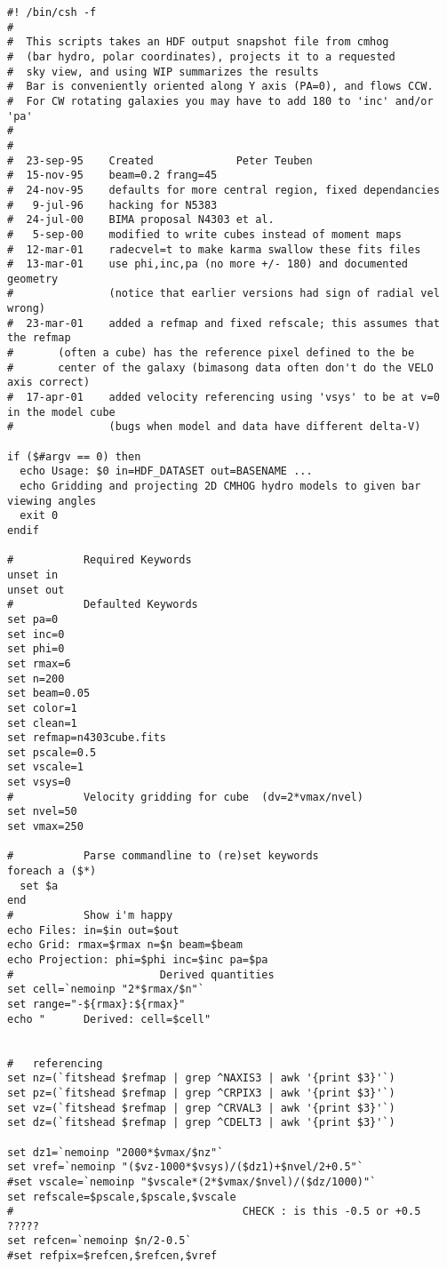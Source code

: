 \documentclass[11pt]{article}
\begin{document}
\footnotesize\begin{verbatim}
#! /bin/csh -f
#
#  This scripts takes an HDF output snapshot file from cmhog
#  (bar hydro, polar coordinates), projects it to a requested
#  sky view, and using WIP summarizes the results
#  Bar is conveniently oriented along Y axis (PA=0), and flows CCW.
#  For CW rotating galaxies you may have to add 180 to 'inc' and/or 'pa'
#
#
#  23-sep-95	Created				Peter Teuben
#  15-nov-95    beam=0.2 frang=45
#  24-nov-95    defaults for more central region, fixed dependancies
#   9-jul-96    hacking for N5383 
#  24-jul-00    BIMA proposal N4303 et al.
#   5-sep-00    modified to write cubes instead of moment maps
#  12-mar-01    radecvel=t to make karma swallow these fits files
#  13-mar-01    use phi,inc,pa (no more +/- 180) and documented geometry
#               (notice that earlier versions had sign of radial vel wrong)
#  23-mar-01    added a refmap and fixed refscale; this assumes that the refmap
#		(often a cube) has the reference pixel defined to the be 
#		center of the galaxy (bimasong data often don't do the VELO axis correct)
#  17-apr-01    added velocity referencing using 'vsys' to be at v=0 in the model cube
#               (bugs when model and data have different delta-V)

if ($#argv == 0) then
  echo Usage: $0 in=HDF_DATASET out=BASENAME ...
  echo Gridding and projecting 2D CMHOG hydro models to given bar viewing angles
  exit 0
endif

# 			Required Keywords
unset in
unset out
# 			Defaulted Keywords
set pa=0
set inc=0
set phi=0
set rmax=6
set n=200
set beam=0.05
set color=1
set clean=1
set refmap=n4303cube.fits
set pscale=0.5
set vscale=1
set vsys=0
#			Velocity gridding for cube  (dv=2*vmax/nvel)
set nvel=50
set vmax=250

#			Parse commandline to (re)set keywords
foreach a ($*)
  set $a
end
#			Show i'm happy
echo Files: in=$in out=$out 
echo Grid: rmax=$rmax n=$n beam=$beam
echo Projection: phi=$phi inc=$inc pa=$pa
#                       Derived quantities
set cell=`nemoinp "2*$rmax/$n"`
set range="-${rmax}:${rmax}"
echo "      Derived: cell=$cell"


#   referencing 
set nz=(`fitshead $refmap | grep ^NAXIS3 | awk '{print $3}'`)
set pz=(`fitshead $refmap | grep ^CRPIX3 | awk '{print $3}'`)
set vz=(`fitshead $refmap | grep ^CRVAL3 | awk '{print $3}'`)
set dz=(`fitshead $refmap | grep ^CDELT3 | awk '{print $3}'`)

set dz1=`nemoinp "2000*$vmax/$nz"`
set vref=`nemoinp "($vz-1000*$vsys)/($dz1)+$nvel/2+0.5"`
#set vscale=`nemoinp "$vscale*(2*$vmax/$nvel)/($dz/1000)"`
set refscale=$pscale,$pscale,$vscale
#                                    CHECK : is this -0.5 or +0.5   ?????
set refcen=`nemoinp $n/2-0.5`
#set refpix=$refcen,$refcen,$vref



\end{verbatim}
\end{document}
